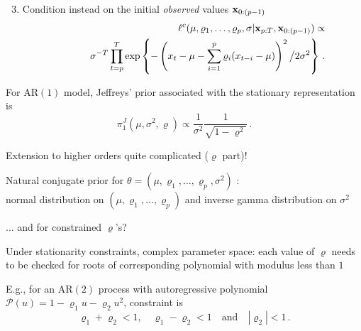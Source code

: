 \begin{slide}
\begin{enumerate}\setcounter{enumi}{2}
\item Condition instead on the initial {\em observed} values $\mathbf{x}_{0:(p-1)}$\small
\begin{eqnarray*}
 && \ell^c(\mu,\varrho_1,\ldots,\varrho_p,\sigma|\mathbf{x}_{p:T},\mathbf{x}_{0:(p-1)}) \propto \\
 && \qquad \sigma^{-T} \prod_{t=p}^T \exp\left\{-\left(x_t-\mu - \sum_{i=1}^p \varrho_i (x_{t-i}-\mu) \right)^2 \big/ 2\sigma^2 \right\}\,. \normalsize
\end{eqnarray*}
\end{enumerate}


\end{slide}\begin{slide}

For AR$(1)$ model, Jeffreys' prior associated with the stationary representation is
$$
\pi_1^J(\mu,\sigma^2,\varrho) \propto \frac{1}{\sigma^2} \frac{1}{\sqrt{1-\varrho^2}} \,.
$$

\pause Extension to higher orders quite complicated ($\varrho$ part)!

\vs\pause Natural conjugate prior for
$\theta=(\mu,\varrho_1,\ldots,\allowbreak \varrho_p,\allowbreak \sigma^2)$ :\\
normal distribution on $(\mu,\varrho_1,\ldots,\varrho_p)$ 
and inverse gamma distribution on $\sigma^2$

\pause... and for constrained $\varrho$'s?

\end{slide}\begin{slide}

Under stationarity constraints, complex parameter space: each value of $\varrho$ needs
to be checked for roots of corresponding polynomial with modulus less than $1$

\vs\pause
E.g., for an AR$(2)$ process with autoregressive polynomial
$\mathcal{P}(u)=1-\varrho_1u-\varrho_2u^2$, constraint is
$$
\varrho_1+\varrho_2<1, \quad \varrho_1-\varrho_2<1 \quad\text{and}\quad |\varrho_2|<1\,.
$$
\begin{flushright}
\hyperlink{Rootpara}{}
\end{flushright}

\end{slide}\begin{slide}[label=DLrepa]


\end{slide}
